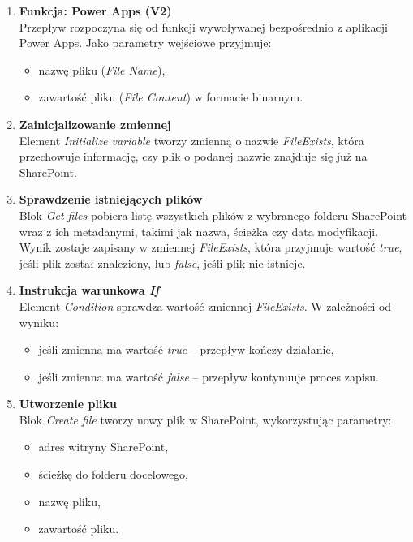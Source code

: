 \begin{enumerate}
    \item \textbf{Funkcja: Power Apps (V2)} \\
    Przepływ rozpoczyna się od funkcji wywoływanej bezpośrednio z aplikacji Power Apps. Jako parametry wejściowe przyjmuje:
    \begin{itemize}
        \item nazwę pliku (\textit{File Name}),
        \item zawartość pliku (\textit{File Content}) w formacie binarnym.
    \end{itemize}

    \item \textbf{Zainicjalizowanie zmiennej} \\
    Element \textit{Initialize variable} tworzy zmienną o nazwie \textit{FileExists}, która przechowuje informację, czy plik o podanej nazwie znajduje się już na SharePoint.

    \item \textbf{Sprawdzenie istniejących plików} \\
    Blok \textit{Get files} pobiera listę wszystkich plików z wybranego folderu SharePoint wraz z ich metadanymi, takimi jak nazwa, ścieżka czy data modyfikacji. Wynik zostaje zapisany w zmiennej \textit{FileExists}, która przyjmuje wartość \textit{true}, jeśli plik został znaleziony, lub \textit{false}, jeśli plik nie istnieje.

    \item \textbf{Instrukcja warunkowa \emph{If}} \\
    Element \textit{Condition} sprawdza wartość zmiennej \textit{FileExists}. W zależności od wyniku:
    \begin{itemize}
        \item jeśli zmienna ma wartość \textit{true} -- przepływ kończy działanie,
        \item jeśli zmienna ma wartość \textit{false} -- przepływ kontynuuje proces zapisu.
    \end{itemize}

    \item \textbf{Utworzenie pliku} \\
    Blok \textit{Create file} tworzy nowy plik w SharePoint, wykorzystując parametry:
    \begin{itemize}
        \item adres witryny SharePoint,
        \item ścieżkę do folderu docelowego,
        \item nazwę pliku,
        \item zawartość pliku.
    \end{itemize}


\end{enumerate}
